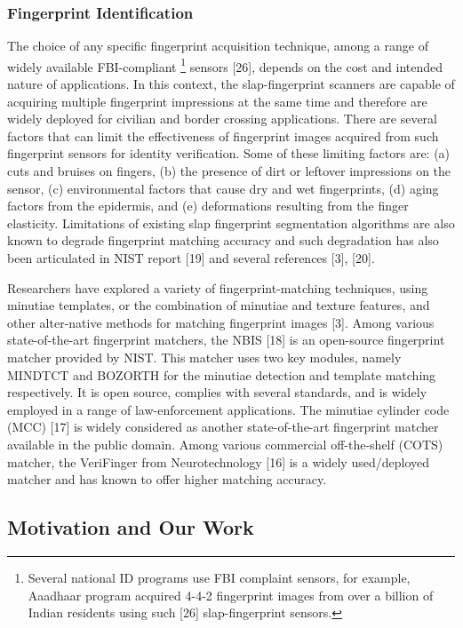 \subsubsection{Fingerprint Identification}
The choice of any specific fingerprint acquisition technique, among a range of widely available FBI-compliant \footnote[1]{Several national ID programs use FBI complaint sensors, for example, Aaadhaar program acquired 4-4-2 fingerprint images from over a billion of Indian residents using such [26] slap-fingerprint sensors.} sensors [26], depends on the cost and intended nature of applications. In this context, the slap-fingerprint scanners are capable of acquiring multiple fingerprint impressions at the same time and therefore are widely deployed for civilian and border crossing applications. There are several factors that can limit the effectiveness of ﬁngerprint images acquired from such fingerprint sensors for identity verification. Some of these limiting factors are: (a) cuts and bruises on ﬁngers, (b) the presence of dirt or leftover impressions on the sensor, (c) environmental factors that cause dry and wet fingerprints, (d) aging factors from the epidermis, and (e) deformations resulting from the finger elasticity. Limitations of existing slap fingerprint segmentation algorithms are also known to degrade fingerprint matching accuracy and such degradation has also been articulated in NIST report [19] and several references [3], [20].

Researchers have explored a variety of fingerprint-matching techniques, using minutiae templates, or the combination of minutiae and texture features, and other alter-native methods for matching fingerprint images [3]. Among various state-of-the-art fingerprint matchers, the NBIS [18] is an open-source fingerprint matcher provided by NIST. This matcher uses two key modules, namely MINDTCT and BOZORTH for the minutiae detection and template matching respectively. It is open source, complies with several standards, and is widely employed in a range of law-enforcement applications. The minutiae cylinder code (MCC) [17] is widely considered as another state-of-the-art fingerprint matcher available in the public domain. Among various commercial off-the-shelf (COTS) matcher, the VeriFinger from Neurotechnology [16] is a widely used/deployed matcher and has known to offer higher matching accuracy. 

\subsection{Motivation and Our Work}


